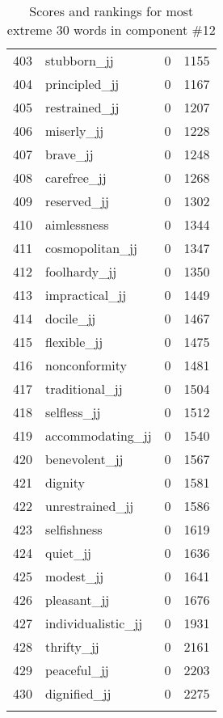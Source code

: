 \begin{longtable}[!htbp]{| rlr@{.}l |}
    403 & stubborn\_jj & 0 & 1155 \\
    404 & principled\_jj & 0 & 1167 \\
    405 & restrained\_jj & 0 & 1207 \\
    406 & miserly\_jj & 0 & 1228 \\
    407 & brave\_jj & 0 & 1248 \\
    408 & carefree\_jj & 0 & 1268 \\
    409 & reserved\_jj & 0 & 1302 \\
    410 & aimlessness & 0 & 1344 \\
    411 & cosmopolitan\_jj & 0 & 1347 \\
    412 & foolhardy\_jj & 0 & 1350 \\
    413 & impractical\_jj & 0 & 1449 \\
    414 & docile\_jj & 0 & 1467 \\
    415 & flexible\_jj & 0 & 1475 \\
    416 & nonconformity & 0 & 1481 \\
    417 & traditional\_jj & 0 & 1504 \\
    418 & selfless\_jj & 0 & 1512 \\
    419 & accommodating\_jj & 0 & 1540 \\
    420 & benevolent\_jj & 0 & 1567 \\
    421 & dignity & 0 & 1581 \\
    422 & unrestrained\_jj & 0 & 1586 \\
    423 & selfishness & 0 & 1619 \\
    424 & quiet\_jj & 0 & 1636 \\
    425 & modest\_jj & 0 & 1641 \\
    426 & pleasant\_jj & 0 & 1676 \\
    427 & individualistic\_jj & 0 & 1931 \\
    428 & thrifty\_jj & 0 & 2161 \\
    429 & peaceful\_jj & 0 & 2203 \\
    430 & dignified\_jj & 0 & 2275 \\
    \hline
    \caption{Scores and rankings for most extreme 30 words in component \#12} \\
\end{longtable}
